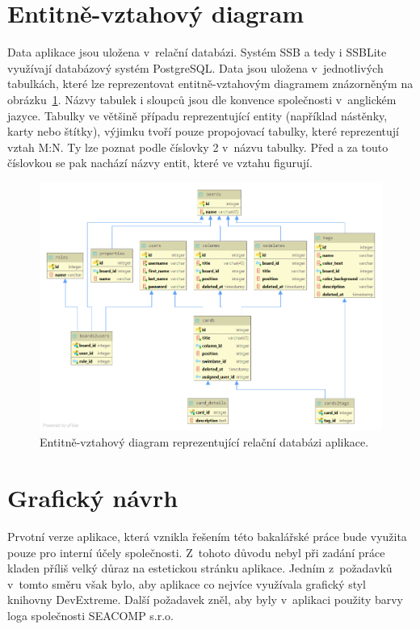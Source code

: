 \section{Entitně-vztahový diagram}\label{sec:erd}
Data aplikace jsou uložena v~relační databázi. Systém SSB a tedy i SSBLite využívají databázový systém PostgreSQL. Data jsou uložena v~jednotlivých tabulkách, které lze reprezentovat entitně-vztahovým diagramem znázorněným na obrázku~\ref{img:erd}. Názvy tabulek i sloupců jsou dle konvence společnosti v~anglickém jazyce. Tabulky ve většině případu reprezentující entity (například nástěnky, karty nebo štítky), výjimku tvoří pouze propojovací tabulky, které reprezentují vztah M:N. Ty lze poznat podle číslovky 2 v~názvu tabulky. Před a za touto číslovkou se pak nachází názvy entit, které ve vztahu figurují.

\begin{figure}[H]
	\centering
	\label{img:erd}
	\includegraphics[width=\textwidth]{obrazky-figures/erd.png}
	\caption{Entitně-vztahový diagram reprezentující relační databázi aplikace.}
\end{figure}


\section{Grafický návrh}
Prvotní verze aplikace, která vznikla řešením této bakalářské práce bude využita pouze pro interní účely společnosti. Z~tohoto důvodu nebyl při zadání práce kladen příliš velký důraz na estetickou stránku aplikace. Jedním z~požadavků v~tomto směru však bylo, aby aplikace co nejvíce využívala grafický styl knihovny DevExtreme. Další požadavek zněl, aby byly v~aplikaci použity barvy loga společnosti SEACOMP s.r.o.

